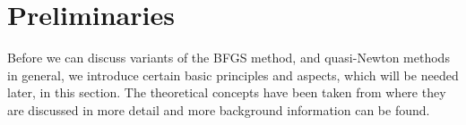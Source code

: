 \chapter{Preliminaries}

Before we can discuss variants of the BFGS method, and quasi-Newton methods in general, we introduce certain basic principles and aspects, which will be needed later, in this section. The theoretical concepts have been taken from \cite{BerkolaikoKuchment:2013} where they are discussed in more detail and more background information can be found.





